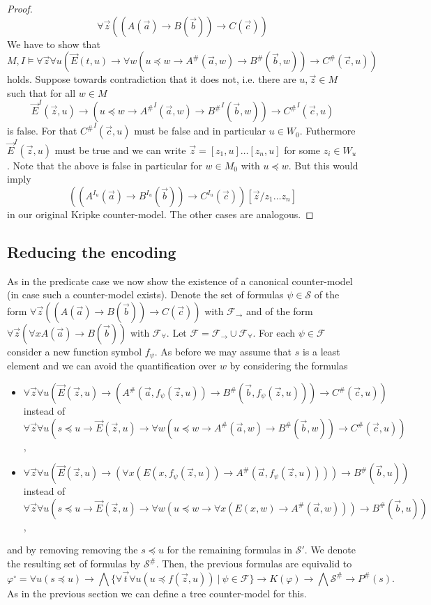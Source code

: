 \documentclass[a4paper,12pt]{report}
\theoremstyle{definition}
\theoremstyle{definition}
\theoremstyle{definition}
\theoremstyle{definition}
\theoremstyle{definition}
\theoremstyle{definition}
\theoremstyle{definition}
\begin{document}
\begin{proof}
		$$ \forall \vec z((A(\vec a)\to B(\vec b))\to C(\vec c))$$
		We have to show that
		$$M, I\models \forall \vec z\forall u(\vec E(t, u)\to \forall w(u\preceq w\to A^\#(\vec a, w)\to B^\#(\vec b, w))\to C^\#(\vec c, u))$$
		holds. Suppose towards contradiction that it does not, i.e. there are $u, \vec z\in M$ such that for all $w\in M$
		$$\vec E^I(\vec z, u)\to (u\preceq w\to {A^\#}^I(\vec a, w)\to {B^\#}^I(\vec b, w))\to {C^\#}^I(\vec c, u)$$ is false. For that ${C^\#}^I(\vec c, u)$ must be false and in particular $u\in W_0$. Futhermore $\vec E^I(\vec z, u)$ must be true and we can write $\vec z = [z_1, u]\dots[z_n, u]$ for some $z_i\in W_u$. Note that the above is false in particular for $w\in M_0$ with $u\preceq w$. But this would imply
		$$((A^{I_u}(\vec a)\to B^{I_u}(\vec b))\to C^{I_u}(\vec c))[\vec z/z_1\dots z_n]$$in our original Kripke counter-model. The other cases are analogous.
	\end{proof}
	
	\subsection{Reducing the encoding}
	
	As in the predicate case we now show the existence of a canonical counter-model (in case such a counter-model exists). Denote the set of formulas $\psi\in\mathcal S$ of the form $\forall\vec z((A(\vec a)\to B(\vec b))\to C(\vec c))$ with $\mathcal F_\to$ and of the form $\forall \vec z(\forall xA(\vec a)\to B(\vec b))$ with $\mathcal F_\forall$. Let $\mathcal F = \mathcal F_\to\cup\mathcal F_\forall$. For each  $\psi\in\mathcal F$ consider a new function symbol $f_\psi$. As before we may assume that $s$ is a least element and we can avoid the quantification over $w$ by considering the formulas
	\begin{itemize}
		\item $\forall \vec z\forall u(\vec E(\vec z, u)\to (A^\#(\vec a, f_\psi(\vec z, u))\to B^\#(\vec b, f_\psi(\vec z, u)))\to C^\#(\vec c, u))$\\instead of $\forall \vec z\forall u(s\preceq u\to\vec E(\vec z, u)\to \forall w(u\preceq w\to A^\#(\vec a, w)\to B^\#(\vec b, w))\to C^\#(\vec c, u))$,
		\item $\forall \vec z\forall u(\vec E(\vec z, u)\to (\forall x(E(x, f_\psi(\vec z, u))\to A^\#(\vec a, f_\psi(\vec z, u))))\to B^\#(\vec b, u))$\\instead of $\forall \vec z\forall u(s\preceq u\to\vec E(\vec z, u)\to \forall w(u\preceq w\to \forall x(E(x, w)\to A^\#(\vec a, w)))\to B^\#(\vec b, u))$,
	\end{itemize}
	and by removing removing the $s\preceq u$ for the remaining formulas in $\mathcal S'$.
	We denote the resulting set of formulas by $\mathcal S^\#$.
	Then, the previous formulas are equivalid to
	$$\varphi^\circ= \forall u(s\preceq u)\to \bigwedge\{\forall \vec t\forall u(u\preceq f(\vec z, u))\:|\:\psi\in\mathcal F\}\to K(\varphi)\to\bigwedge\mathcal S^\#\to P^\#(s).$$
	As in the previous section we can define a tree counter-model for this.
	
\end{document}
